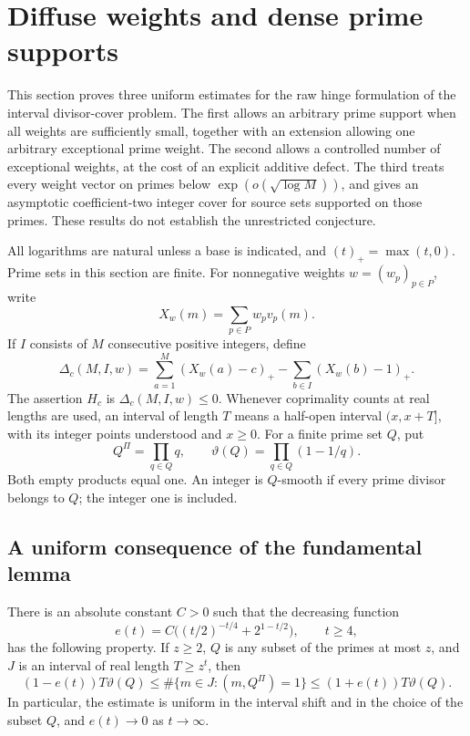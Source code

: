 \section{Diffuse weights and dense prime supports}
\label{an:section}

This section proves three uniform estimates for the raw hinge formulation of
the interval divisor-cover problem. The first allows an arbitrary prime
support when all weights are sufficiently small, together with an extension
allowing one arbitrary exceptional prime weight. The second allows a
controlled number of exceptional weights, at the cost of an explicit
additive defect. The third treats every weight vector on primes below
\(\exp(o(\sqrt{\log M}))\), and gives an asymptotic coefficient-two
integer cover for source sets supported on those primes. These results do
not establish the unrestricted conjecture.

All logarithms are natural unless a base is indicated, and
\((t)_+=\max(t,0)\). Prime sets in this section are finite. For nonnegative
weights \(w=(w_p)_{p\in P}\), write
\[
 X_w(m)=\sum_{p\in P}w_pv_p(m).
\]
If \(I\) consists of \(M\) consecutive positive integers, define
\[
 \Delta_c(M,I,w)
 =\sum_{a=1}^{M}(X_w(a)-c)_+
   -\sum_{b\in I}(X_w(b)-1)_+.
\]
The assertion \(H_c\) is \(\Delta_c(M,I,w)\le0\). Whenever coprimality
counts at real lengths are used, an interval of length \(T\) means a
half-open interval \((x,x+T]\), with its integer points understood and
\(x\ge0\). For a finite prime set \(Q\), put
\[
 Q^{\Pi}=\prod_{q\in Q}q,
 \qquad \vartheta(Q)=\prod_{q\in Q}(1-1/q).
\]
Both empty products equal one. An integer is \(Q\)-smooth if every prime
divisor belongs to \(Q\); the integer one is included.

\subsection{A uniform consequence of the fundamental lemma}

\begin{lemma}
\label{an:sieve}
There is an absolute constant \(C>0\) such that the decreasing function
\begin{equation}
 e(t)=C\bigl((t/2)^{-t/4}+2^{1-t/2}\bigr),\qquad t\ge4,
 \label{an:base-error}
\end{equation}
has the following property. If \(z\ge2\), \(Q\) is any subset of the
primes at most \(z\), and \(J\) is an interval of real length
\(T\ge z^t\), then
\[
 (1-e(t))T\vartheta(Q)
 \le \#\{m\in J:(m,Q^{\Pi})=1\}
 \le (1+e(t))T\vartheta(Q).
\]
In particular, the estimate is uniform in the interval shift and in the
choice of the subset \(Q\), and \(e(t)\to0\) as \(t\to\infty\).
\end{lemma}

